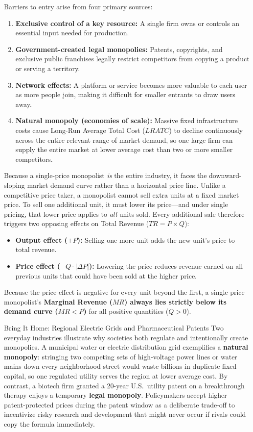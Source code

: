 \documentclass[11pt,letterpaper]{article}
\begin{document}
Barriers to entry arise from four primary sources:
\begin{enumerate}
    \item \textbf{Exclusive control of a key resource:} A single firm owns or controls an essential input needed for production.
    \item \textbf{Government-created legal monopolies:} Patents, copyrights, and exclusive public franchises legally restrict competitors from copying a product or serving a territory.
    \item \textbf{Network effects:} A platform or service becomes more valuable to each user as more people join, making it difficult for smaller entrants to draw users away.
    \item \textbf{Natural monopoly (economies of scale):} Massive fixed infrastructure costs cause Long-Run Average Total Cost ($LRATC$) to decline continuously across the entire relevant range of market demand, so one large firm can supply the entire market at lower average cost than two or more smaller competitors.
\end{enumerate}

Because a single-price monopolist \emph{is} the entire industry, it faces the downward-sloping market demand curve rather than a horizontal price line. Unlike a competitive price taker, a monopolist cannot sell extra units at a fixed market price. To sell one additional unit, it must lower its price---and under single pricing, that lower price applies to \emph{all} units sold. Every additional sale therefore triggers two opposing effects on Total Revenue ($TR = P \times Q$):
\begin{itemize}
    \item \textbf{Output effect ($+P$):} Selling one more unit adds the new unit's price to total revenue.
    \item \textbf{Price effect ($-Q \cdot |\Delta P|$):} Lowering the price reduces revenue earned on all previous units that could have been sold at the higher price.
\end{itemize}
Because the price effect is negative for every unit beyond the first, a single-price monopolist's \textbf{Marginal Revenue ($MR$) always lies strictly below its demand curve ($MR < P$)} for all positive quantities ($Q > 0$).

\begin{examplecase}{Bring It Home: Regional Electric Grids and Pharmaceutical Patents}
Two everyday industries illustrate why societies both regulate and intentionally create monopolies. A municipal water or electric distribution grid exemplifies a \textbf{natural monopoly}: stringing two competing sets of high-voltage power lines or water mains down every neighborhood street would waste billions in duplicate fixed capital, so one regulated utility serves the region at lower average cost. By contrast, a biotech firm granted a 20-year U.S.\ utility patent on a breakthrough therapy enjoys a temporary \textbf{legal monopoly}. Policymakers accept higher patent-protected prices during the patent window as a deliberate trade-off to incentivize risky research and development that might never occur if rivals could copy the formula immediately.
\end{examplecase}
\end{document}
